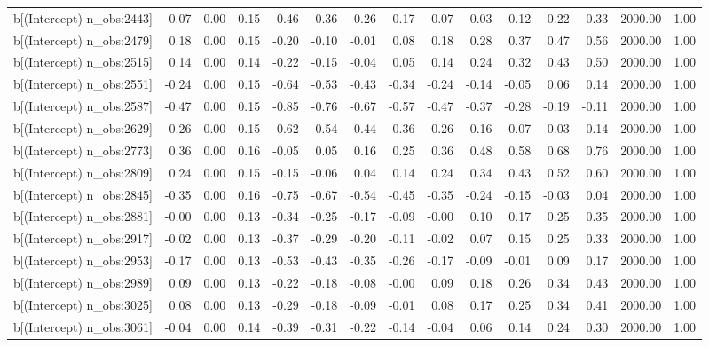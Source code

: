 \begin{table}[ht]
\begin{tabular}{rrrrrrrrrrrrrrr}
  b[(Intercept) n\_obs:2443] & -0.07 & 0.00 & 0.15 & -0.46 & -0.36 & -0.26 & -0.17 & -0.07 & 0.03 & 0.12 & 0.22 & 0.33 & 2000.00 & 1.00 \\ 
  b[(Intercept) n\_obs:2479] & 0.18 & 0.00 & 0.15 & -0.20 & -0.10 & -0.01 & 0.08 & 0.18 & 0.28 & 0.37 & 0.47 & 0.56 & 2000.00 & 1.00 \\ 
  b[(Intercept) n\_obs:2515] & 0.14 & 0.00 & 0.14 & -0.22 & -0.15 & -0.04 & 0.05 & 0.14 & 0.24 & 0.32 & 0.43 & 0.50 & 2000.00 & 1.00 \\ 
  b[(Intercept) n\_obs:2551] & -0.24 & 0.00 & 0.15 & -0.64 & -0.53 & -0.43 & -0.34 & -0.24 & -0.14 & -0.05 & 0.06 & 0.14 & 2000.00 & 1.00 \\ 
  b[(Intercept) n\_obs:2587] & -0.47 & 0.00 & 0.15 & -0.85 & -0.76 & -0.67 & -0.57 & -0.47 & -0.37 & -0.28 & -0.19 & -0.11 & 2000.00 & 1.00 \\ 
  b[(Intercept) n\_obs:2629] & -0.26 & 0.00 & 0.15 & -0.62 & -0.54 & -0.44 & -0.36 & -0.26 & -0.16 & -0.07 & 0.03 & 0.14 & 2000.00 & 1.00 \\ 
  b[(Intercept) n\_obs:2773] & 0.36 & 0.00 & 0.16 & -0.05 & 0.05 & 0.16 & 0.25 & 0.36 & 0.48 & 0.58 & 0.68 & 0.76 & 2000.00 & 1.00 \\ 
  b[(Intercept) n\_obs:2809] & 0.24 & 0.00 & 0.15 & -0.15 & -0.06 & 0.04 & 0.14 & 0.24 & 0.34 & 0.43 & 0.52 & 0.60 & 2000.00 & 1.00 \\ 
  b[(Intercept) n\_obs:2845] & -0.35 & 0.00 & 0.16 & -0.75 & -0.67 & -0.54 & -0.45 & -0.35 & -0.24 & -0.15 & -0.03 & 0.04 & 2000.00 & 1.00 \\ 
  b[(Intercept) n\_obs:2881] & -0.00 & 0.00 & 0.13 & -0.34 & -0.25 & -0.17 & -0.09 & -0.00 & 0.10 & 0.17 & 0.25 & 0.35 & 2000.00 & 1.00 \\ 
  b[(Intercept) n\_obs:2917] & -0.02 & 0.00 & 0.13 & -0.37 & -0.29 & -0.20 & -0.11 & -0.02 & 0.07 & 0.15 & 0.25 & 0.33 & 2000.00 & 1.00 \\ 
  b[(Intercept) n\_obs:2953] & -0.17 & 0.00 & 0.13 & -0.53 & -0.43 & -0.35 & -0.26 & -0.17 & -0.09 & -0.01 & 0.09 & 0.17 & 2000.00 & 1.00 \\ 
  b[(Intercept) n\_obs:2989] & 0.09 & 0.00 & 0.13 & -0.22 & -0.18 & -0.08 & -0.00 & 0.09 & 0.18 & 0.26 & 0.34 & 0.43 & 2000.00 & 1.00 \\ 
  b[(Intercept) n\_obs:3025] & 0.08 & 0.00 & 0.13 & -0.29 & -0.18 & -0.09 & -0.01 & 0.08 & 0.17 & 0.25 & 0.34 & 0.41 & 2000.00 & 1.00 \\ 
  b[(Intercept) n\_obs:3061] & -0.04 & 0.00 & 0.14 & -0.39 & -0.31 & -0.22 & -0.14 & -0.04 & 0.06 & 0.14 & 0.24 & 0.30 & 2000.00 & 1.00 \\ 

\end{tabular}
\end{table}
